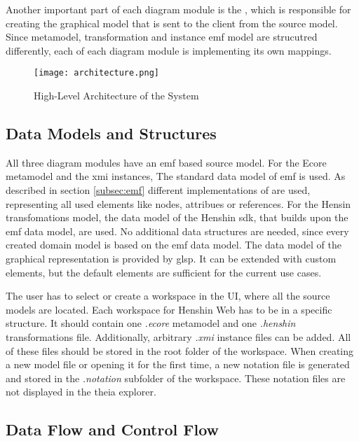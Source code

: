   Another important part of each diagram module is the , which is responsible for creating the graphical model that is sent to the client from the source model. Since metamodel, transformation and instance \ac{emf} model are strucutred differently, each  of each diagram module is implementing its own mappings.

  \begin{figure}
    \centering
    \texttt{[image: architecture.png]}
    \caption{High-Level Architecture of the System}
    \label{fig:architecture}
  \end{figure}

  \subsection{Data Models and Structures}
  \label{subsec:data-models}

  All three diagram modules have an \ac{emf} based source model. For the Ecore metamodel and the \ac{xmi} instances, The standard data model of \ac{emf} is used. As described in section \ref{subsec:emf} different implementations of  are used, representing all used elements like nodes, attribues or references. For the Hensin transfomations model, the data model of the Henshin \ac{sdk}, that builds upon the \ac{emf} data model, are used. No additional data structures are needed, since every created domain model is based on the \ac{emf} data model. The data model of the graphical representation is provided by \ac{glsp}. It can be extended with custom elements, but the default elements are sufficient for the current use cases. 

  The user has to select or create a workspace in the UI, where all the source models are located. Each workspace for Henshin Web has to be in a specific structure. It should contain one \textit{.ecore} metamodel and one \textit{.henshin} transformations file. Additionally, arbitrary \textit{.xmi} instance files can be added. All of these files should be stored in the root folder of the workspace. When creating a new model file or opening it for the first time, a new notation file is generated and stored in the \textit{.notation} subfolder of the workspace. These notation files are not displayed in the theia explorer.  


  \subsection{Data Flow and Control Flow}
  \label{subsec:data-flow}


